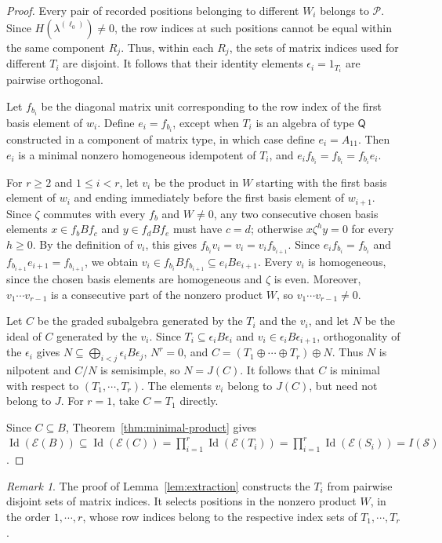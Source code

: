 \documentclass[11pt,reqno]{amsart}
\newcommand{\E}{\mathcal E}
\newcommand{\Id}{\operatorname{Id}}
\newcommand{\Qtype}{\mathsf Q}
\theoremstyle{definition}
\theoremstyle{remark}
\newtheorem{remark}[theorem]{Remark}
\numberwithin{equation}{section}
\begin{document}
\begin{proof}
Every pair of recorded positions belonging to different
$W_i$ belongs to $\mathcal P$. Since $H(\lambda^{(\ell_0)})\ne0$, the row indices
at such positions cannot be equal within the same
component $R_j$.
Thus, within each $R_j$, the sets of matrix indices
used for different $T_i$ are disjoint.
It follows that their identity elements
$\epsilon_i=1_{T_i}$ are pairwise orthogonal.

Let $f_{b_i}$ be the diagonal matrix unit corresponding
to the row index of the first basis element of $w_i$.
Define $e_i=f_{b_i}$, except when $T_i$ is an algebra
of type $\Qtype$ constructed in a component of matrix type,
in which case define $e_i=A_{11}$.
Then $e_i$ is a minimal nonzero homogeneous idempotent
of $T_i$, and
$
e_if_{b_i}=f_{b_i}=f_{b_i}e_i$.


For $r\geq2$ and $1\leq i<r$, let $v_i$ be the product
in $W$ starting with the first basis element of $w_i$
and ending immediately before the first basis element
of $w_{i+1}$.
Since $\zeta$ commutes with every $f_b$ and $W\ne0$,
any two consecutive chosen basis elements
$x\in f_bBf_c$ and $y\in f_dBf_e$ must have $c=d$;
otherwise $x\zeta^h y=0$ for every $h\geq0$.
By the definition of $v_i$, this gives
$
f_{b_i}v_i=v_i=v_if_{b_{i+1}}$.
Since $e_if_{b_i}=f_{b_i}$ and
$f_{b_{i+1}}e_{i+1}=f_{b_{i+1}}$, we obtain
$
v_i\in f_{b_i}Bf_{b_{i+1}}
\subseteq e_iBe_{i+1}$.
Every $v_i$ is homogeneous, since the chosen basis elements
are homogeneous and $\zeta$ is even.
Moreover, $v_1\cdots v_{r-1}$ is a consecutive part
of the nonzero product $W$, so
$v_1\cdots v_{r-1}\ne0$.

Let $C$ be the graded subalgebra generated by the $T_i$
and the $v_i$, and let $N$ be the ideal of $C$
generated by the $v_i$. 
Since
$T_i\subseteq\epsilon_iB\epsilon_i$
and
$v_i\in\epsilon_iB\epsilon_{i+1}$,
orthogonality of the $\epsilon_i$ gives $
N\subseteq\bigoplus_{i<j}\epsilon_iB\epsilon_j$,
$N^r=0$,
and $
C=(T_1\oplus\cdots\oplus T_r)\oplus N$.
Thus $N$ is nilpotent and $C/N$ is semisimple,
so $N=J(C)$.
It follows that $C$ is minimal with respect to
$(T_1,\cdots,T_r)$.
The elements $v_i$ belong to $J(C)$, but need not
belong to $J$.
For $r=1$, take $C=T_1$ directly.

Since $C\subseteq B$, Theorem~\ref{thm:minimal-product}
gives
$
\Id(\E(B))
\subseteq\Id(\E(C))
=\prod_{i=1}^r\Id(\E(T_i))
=\prod_{i=1}^r\Id(\E(S_i))
=I(\mathcal S)$.
\end{proof}


\begin{remark}
The proof of Lemma~\ref{lem:extraction} constructs the $T_i$
from pairwise disjoint sets of matrix indices.
It selects positions in the nonzero product $W$, in the order
$1,\cdots,r$, whose row indices belong to the respective
index sets of $T_1,\cdots,T_r$.

\end{remark}
\end{document}

